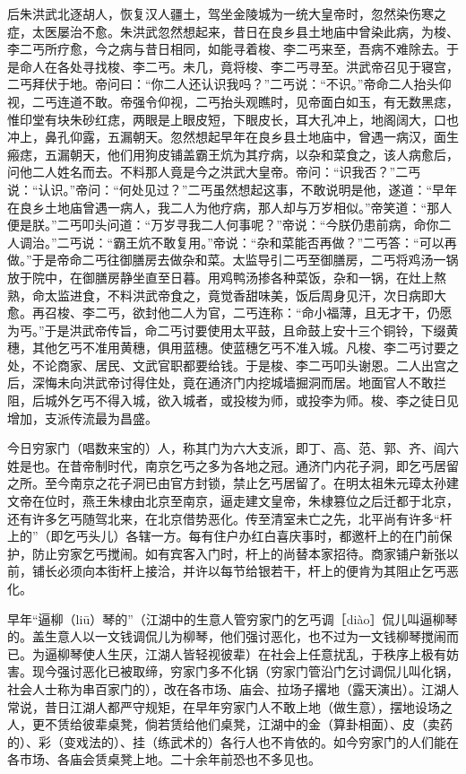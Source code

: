 \documentclass[12pt,UTF8]{ctexbook}
\begin{document}
后朱洪武北逐胡人，恢复汉人疆土，驾坐金陵城为一统大皇帝时，忽然染伤寒之症，太医屡治不愈。朱洪武忽然想起来，昔日在良乡县土地庙中曾染此病，为梭、李二丐所疗愈，今之病与昔日相同，如能寻着梭、李二丐来至，吾病不难除去。于是命人在各处寻找梭、李二丐。未几，竟将梭、李二丐寻至。洪武帝召见于寝宫，二丐拜伏于地。帝问曰：“你二人还认识我吗？”二丐说：“不识。”帝命二人抬头仰视，二丐连道不敢。帝强令仰视，二丐抬头观瞧时，见帝面白如玉，有无数黑痣，惟印堂有块朱砂红痣，两眼是上眼皮短，下眼皮长，耳大孔冲上，地阁阔大，口也冲上，鼻孔仰露，五漏朝天。忽然想起早年在良乡县土地庙中，曾遇一病汉，面生瘢痣，五漏朝天，他们用狗皮铺盖霸王炕为其疗病，以杂和菜食之，该人病愈后，问他二人姓名而去。不料那人竟是今之洪武大皇帝。帝问：“识我否？”二丐说：“认识。”帝问：“何处见过？”二丐虽然想起这事，不敢说明是他，遂道：“早年在良乡土地庙曾遇一病人，我二人为他疗病，那人却与万岁相似。”帝笑道：“那人便是朕。”二丐叩头问道：“万岁寻我二人何事呢？”帝说：“今朕仍患前病，命你二人调治。”二丐说：“霸王炕不敢复用。”帝说：“杂和菜能否再做？”二丐答：“可以再做。”于是帝命二丐往御膳房去做杂和菜。太监导引二丐至御膳房，二丐将鸡汤一锅放于院中，在御膳房静坐直至日暮。用鸡鸭汤掺各种菜饭，杂和一锅，在灶上熬熟，命太监进食，不料洪武帝食之，竟觉香甜味美，饭后周身见汗，次日病即大愈。再召梭、李二丐，欲封他二人为官，二丐连称：“命小福薄，且无才干，仍愿为丐。”于是洪武帝传旨，命二丐讨要使用太平鼓，且命鼓上安十三个铜铃，下缀黄穗，其他乞丐不准用黄穗，俱用蓝穗。使蓝穗乞丐不准入城。凡梭、李二丐讨要之处，不论商家、居民、文武官职都要给钱。于是梭、李二丐叩头谢恩。二人出宫之后，深悔未向洪武帝讨得住处，竟在通济门内挖城墙掘洞而居。地面官人不敢拦阻，后城外乞丐不得入城，欲入城者，或投梭为师，或投李为师。梭、李之徒日见增加，支派传流最为昌盛。

今日穷家门（唱数来宝的）人，称其门为六大支派，即丁、高、范、郭、齐、阎六姓是也。在昔帝制时代，南京乞丐之多为各地之冠。通济门内花子洞，即乞丐居留之所。至今南京之花子洞已由官方封锁，禁止乞丐居留了。在明太祖朱元璋太孙建文帝在位时，燕王朱棣由北京至南京，逼走建文皇帝，朱棣篡位之后迁都于北京，还有许多乞丐随驾北来，在北京借势恶化。传至清室未亡之先，北平尚有许多“杆上的”（即乞丐头儿）各辖一方。每有住户办红白喜庆事时，都邀杆上的在门前保护，防止穷家乞丐搅闹。如有宾客入门时，杆上的尚替本家招待。商家铺户新张以前，铺长必须向本街杆上接洽，并许以每节给银若干，杆上的便肯为其阻止乞丐恶化。

早年“逼柳（liū）琴的”（江湖中的生意人管穷家门的乞丐调［diào］侃儿叫逼柳琴的。盖生意人以一文钱调侃儿为柳琴，他们强讨恶化，也不过为一文钱柳琴搅闹而已。为逼柳琴使人生厌，江湖人皆轻视彼辈）在社会上任意扰乱，于秩序上极有妨害。现今强讨恶化已被取缔，穷家门多不化锅（穷家门管沿门乞讨调侃儿叫化锅，社会人士称为串百家门的），改在各市场、庙会、拉场子撂地（露天演出）。江湖人常说，昔日江湖人都严守规矩，在早年穷家门人不敢上地（做生意），摆地设场之人，更不赁给彼辈桌凳，倘若赁给他们桌凳，江湖中的金（算卦相面）、皮（卖药的）、彩（变戏法的）、挂（练武术的）各行人也不肯依的。如今穷家门的人们能在各市场、各庙会赁桌凳上地。二十余年前恐也不多见也。
\end{document}
